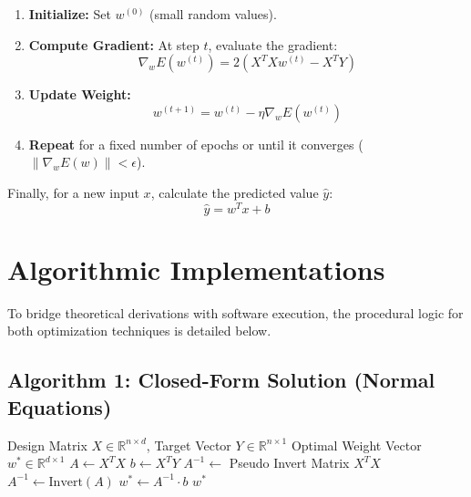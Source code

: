 \documentclass[11pt,a4paper]{article}
\begin{document}
\begin{enumerate}
    \item \textbf{Initialize:} Set $w^{(0)}$ (small random values).
    \item \textbf{Compute Gradient:} At step $t$, evaluate the gradient:
    \begin{equation*}
    \nabla_w E(w^{(t)}) = 2(X^T X w^{(t)} - X^T Y)
    \end{equation*}
    \item \textbf{Update Weight:}
    \begin{equation*}
    w^{(t+1)} = w^{(t)} - \eta \nabla_w E(w^{(t)})
    \end{equation*}
    \item \textbf{Repeat} for a fixed number of epochs or until it converges ($\|\nabla_w E(w)\| < \epsilon$).
\end{enumerate}

Finally, for a new input $x$, calculate the predicted value $\hat{y}$:
\begin{equation*}
\hat{y} = w^T x + b
\end{equation*}

\section{Algorithmic Implementations}

To bridge theoretical derivations with software execution, the procedural logic for both optimization techniques is detailed below.

\subsection*{Algorithm 1: Closed-Form Solution (Normal Equations)}

\begin{algorithm}[H]
\caption{Closed-Form Linear Regression Solver}
\label{alg:closed_form}
\begin{algorithmic}[1]
\Require Design Matrix $X \in \mathbb{R}^{n \times d}$, Target Vector $Y \in \mathbb{R}^{n \times 1}$
\Ensure Optimal Weight Vector $w^* \in \mathbb{R}^{d \times 1}$
    \State $A \gets X^T X$ 
    \State $b \gets X^T Y$ 
        \State $A^{-1} \gets $ Pseudo Invert Matrix $X^T X$ 
    \EndIf
    		\State $A^{-1} \gets \text{Invert}(A)$ 
    \EndIf
    \State $w^* \gets A^{-1} \cdot b$ 
    \State \Return $w^*$
\EndProcedure
\end{algorithmic}
\end{algorithm}
\end{document}
